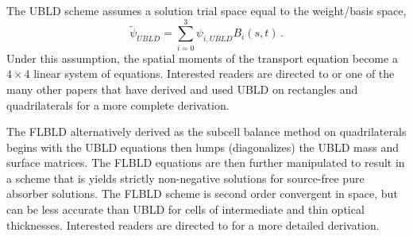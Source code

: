 \documentclass{mc2015}
\newcommand{\benum}{\begin{equation}} 			%
\newcommand{\eenum}{\end{equation}}
\newcommand{\beanum}{\begin{eqnarray}}  %
\newcommand{\eeanum}{\end{eqnarray}}
\newcommand{\eqts}[1]{Eqs. (\ref{#1})}  %
\newcommand{\B}[1]{\ensuremath{{B_{#1} }}}
\newcommand{\p}{\ensuremath{ \partial}}
\newcommand{\abs}[1]{\ensuremath{\left\lvert #1 \right\rvert}}
\newcommand{\omg}{\ensuremath{\vec{\Omega}}}
\newcommand{\pec}{\, ,}
\newcommand{\pep}{\, .}
\begin{document}

The UBLD scheme assumes a solution trial space equal to the weight/basis space,
\benum
\widetilde{\psi}_{UBLD} = \sum_{i=0}^3{\psi_{i,UBLD} \B{i}(s,t)  } \pep
\eenum
Under this assumption, the spatial moments of the transport equation become a $4\times 4$ linear system of equations.  
Interested readers are directed to \cite{adams_dfem} or one of the many other papers that have derived and used UBLD on rectangles and quadrilaterals for a more complete derivation.

The FLBLD \cite{flbld,adams_dfem} alternatively derived as the subcell balance method on quadrilaterals \cite{adams_scb} begins with the UBLD equations then lumps (diagonalizes) the UBLD mass and surface matrices.  The FLBLD equations are then further manipulated to result in a scheme that is yields strictly non-negative solutions for source-free pure absorber solutions.  The FLBLD scheme is second order convergent in space, but can be less accurate than UBLD for cells of intermediate and thin optical thicknesses.  Interested readers are directed to \cite{flbld,adams_dfem,adams_scb} for a more detailed derivation.
\end{document}
